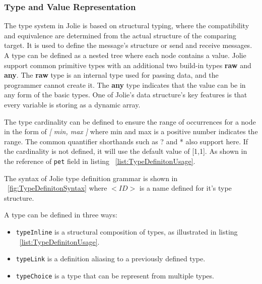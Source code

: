 \subsubsection{Type and Value Representation}
\label{sec:jolie-type-def}

The type system in Jolie is based on structural typing, where the compatibility and equivalence are determined from the actual structure of the comparing target. It is used to define the message's structure or send and receive messages. A type can be defined as a nested tree where each node contains a value. Jolie support common primitive types with an additional two build-in types \textbf{raw} and \textbf{any}. The \textbf{raw} type is an internal type used for passing data, and the programmer cannot create it. The \textbf{any} type indicates that the value can be in any form of the basic types. One of Jolie's data structure's key features is that every variable is storing as a dynamic array.

The type cardinality can be defined to ensure the range of occurrences for a node in the form of \textit{[ min, max ]} where min and max is a positive number indicates the range. The common quantifier shorthands such as ? and * also support here. If the cardinality is not defined, it will use the default value of [1,1]. As shown in the reference of \texttt{pet} field in listing ~\ref{list:TypeDefinitonUsage}. 

The syntax of Jolie type definition grammar is shown in ~\ref{fig:TypeDefinitonSyntax} where \(<ID>\) is a name defined for it's type structure.

A type can be defined in three ways:
\begin{itemize}
	\item \texttt{typeInline} is a structural composition of types, as illustrated in listing ~\ref{list:TypeDefinitonUsage}.
	\item \texttt{typeLink} is a definition aliasing to a previously defined type.
	\item \texttt{typeChoice} is a type that can be represent from multiple types.
\end{itemize}

